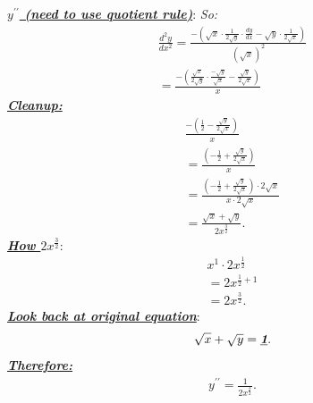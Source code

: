 \documentclass{report}
\begin{document}
  \pagebreak \bigbreak \noindent
  \textbf{\textit{\underline{$y^{\prime\prime}$ (need to use quotient rule)}}}:
  \bigbreak \noindent
  \textit{So:}
  \begin{align*}
    \frac{d^{2}y}{dx^{2}} = \frac{-(\sqrt{x}\cdot \frac{1}{2\sqrt{y}}\cdot \frac{dy}{dx} - \sqrt{y}\cdot \frac{1}{2\sqrt{x}})}{(\sqrt{x})^{2}} \\
    =  \frac{-(\frac{\sqrt{x}}{2\sqrt{y}}\cdot \frac{-\sqrt{y}}{\sqrt{x}} - \frac{\sqrt{y}}{2\sqrt{x}})}{x}
  \end{align*}
  \bigbreak \noindent 
  \bigbreak \noindent 
  \textbf{\textit{\underline{Cleanup:}}}
  \begin{align*}
    \frac{-(\frac{1}{2}-\frac{\sqrt{y}}{2\sqrt{x}})}{x} \\
     = \frac{(-\frac{1}{2}+\frac{\sqrt{y}}{2\sqrt{x}})}{x} \\
     = \frac{(-\frac{1}{2}+\frac{\sqrt{y}}{2\sqrt{x}})\cdot 2\sqrt{x}}{x\cdot 2\sqrt{x}} \\
     = \frac{\sqrt{x}+\sqrt{y}}{2x^{\frac{3}{2}}}
  .\end{align*}
  \bigbreak \noindent 
  \textbf{\textit{\underline{How $2x^{\frac{3}{2}}$}}}:
  \begin{align*}
    x^{1} \cdot 2x^{\frac{1}{2}} \\
    = 2x^{\frac{1}{2}+ 1} \\
    = 2x^{\frac{3}{2}}
  .\end{align*}
  \bigbreak \noindent 
  \textbf{\textit{\underline{Look back at original equation}}}:
  \begin{align*}
    \sqrt{x} + \sqrt{y} = \textbf{\textit{\underline{1}}}
  .\end{align*}
  \textbf{\textit{\underline{Therefore:}}}
  \begin{align*}
   y^{\prime\prime} =  \frac{1}{2x^{\frac{3}{2}}}
  .\end{align*}
\end{document}
